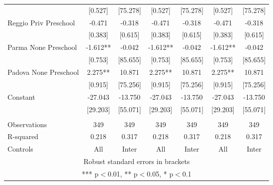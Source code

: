 \begin{tabular}{lcccccc}
 & [0.527] & [75.278] & [0.527] & [75.278] & [0.527] & [75.278] \\
Reggio Priv Preschool & -0.471 & -0.318 & -0.471 & -0.318 & -0.471 & -0.318 \\
 & [0.383] & [0.615] & [0.383] & [0.615] & [0.383] & [0.615] \\
Parma None Preschool & -1.612** & -0.042 & -1.612** & -0.042 & -1.612** & -0.042 \\
 & [0.753] & [85.655] & [0.753] & [85.655] & [0.753] & [85.655] \\
Padova None Preschool & 2.275** & 10.871 & 2.275** & 10.871 & 2.275** & 10.871 \\
 & [0.915] & [75.256] & [0.915] & [75.256] & [0.915] & [75.256] \\
Constant & -27.043 & -13.750 & -27.043 & -13.750 & -27.043 & -13.750 \\
 & [29.203] & [55.071] & [29.203] & [55.071] & [29.203] & [55.071] \\
 &  &  &  &  &  &  \\
Observations & 349 & 349 & 349 & 349 & 349 & 349 \\
R-squared & 0.218 & 0.317 & 0.218 & 0.317 & 0.218 & 0.317 \\
 Controls & All & Inter & All & Inter & All & Inter \\ \hline
\multicolumn{7}{c}{ Robust standard errors in brackets} \\
\multicolumn{7}{c}{ *** p$<$0.01, ** p$<$0.05, * p$<$0.1} \\
\end{tabular}
